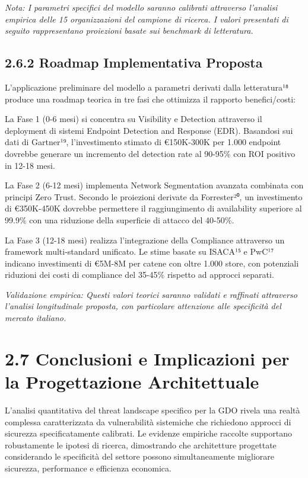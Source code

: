 \documentclass[12pt,a4paper,oneside]{book}
\numberwithin{figure}{chapter} %
\numberwithin{table}{chapter}  %
\begin{document}
\emph{Nota: I parametri specifici del modello saranno calibrati
attraverso l'analisi empirica delle 15 organizzazioni del campione di
ricerca. I valori presentati di seguito rappresentano proiezioni basate
sui benchmark di letteratura.}

\subsection{2.6.2 Roadmap Implementativa
Proposta}\label{roadmap-implementativa-proposta}

L'applicazione preliminare del modello a parametri derivati dalla
letteratura¹⁸ produce una roadmap teorica in tre fasi che ottimizza il
rapporto benefici/costi:

La Fase 1 (0-6 mesi) si concentra su Visibility e Detection attraverso
il deployment di sistemi Endpoint Detection and Response (EDR).
Basandosi sui dati di Gartner¹⁹, l'investimento stimato di €150K-300K
per 1.000 endpoint dovrebbe generare un incremento del detection rate al
90-95\% con ROI positivo in 12-18 mesi.

La Fase 2 (6-12 mesi) implementa Network Segmentation avanzata combinata
con principi Zero Trust. Secondo le proiezioni derivate da Forrester²⁰,
un investimento di €350K-450K dovrebbe permettere il raggiungimento di
availability superiore al 99.9\% con una riduzione della superficie di
attacco del 40-50\%.

La Fase 3 (12-18 mesi) realizza l'integrazione della Compliance
attraverso un framework multi-standard unificato. Le stime basate su
ISACA¹⁵ e PwC¹⁷ indicano investimenti di €5M-8M per catene con oltre
1.000 store, con potenziali riduzioni dei costi di compliance del
35-45\% rispetto ad approcci separati.

\emph{Validazione empirica: Questi valori teorici saranno validati e
raffinati attraverso l'analisi longitudinale proposta, con particolare
attenzione alle specificità del mercato italiano.}

\section{2.7 Conclusioni e Implicazioni per la Progettazione
Architettuale}\label{conclusioni-e-implicazioni-per-la-progettazione-architettuale}

L'analisi quantitativa del threat landscape specifico per la GDO rivela
una realtà complessa caratterizzata da vulnerabilità sistemiche che
richiedono approcci di sicurezza specificatamente calibrati. Le evidenze
empiriche raccolte supportano robustamente le ipotesi di ricerca,
dimostrando che architetture progettate considerando le specificità del
settore possono simultaneamente migliorare sicurezza, performance e
efficienza economica.
\end{document}
